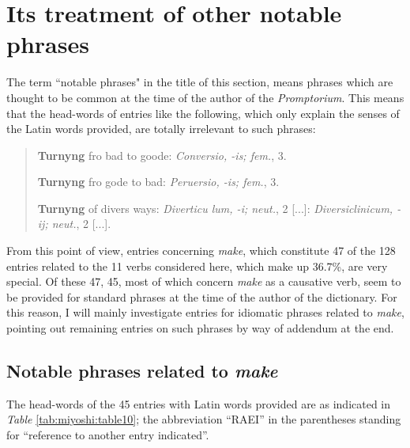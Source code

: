 \documentclass[output=paper,colorlinks,citecolor=brown,arabicfont,chinesefont]{langscibook}
\begin{document}
\section{Its treatment of other notable phrases}

The term “notable phrases" in the title of this section, means phrases which are thought to be common at the time of the author of the \emph{Promptorium}. This means that the head-words of entries like the following, which only explain the senses of the Latin words provided, are totally irrelevant to such phrases:

\begin{quote}
    \textbf{Turnyng} fro bad to goode: \emph{Conversio, -is; fem.}, 3.
    
    \textbf{Turnyng} fro gode to bad: \emph{Peruersio, -is; fem.}, 3.

    \textbf{Turnyng} of divers ways: \emph{Diverticu lum, -i; neut.}, 2 [...]: \emph{Diversiclinicum, -ij; neut.}, 2 [...].
\end{quote}

From this point of view, entries concerning \emph{make}, which constitute 47 of the 128 entries related to the 11 verbs considered here, which make up 36.7\%, are very special. Of these 47, 45, most of which concern \emph{make} as a causative verb, seem to be provided for standard phrases at the time of the author of the dictionary. For this reason, I will mainly investigate entries for idiomatic phrases related to \emph{make}, pointing out remaining entries on such phrases by way of addendum at the end.

\subsection{Notable phrases related to \emph{make}}

The head-words of the 45 entries with Latin words provided are as indicated in \emph{Table} \ref{tab:miyoshi:table10}; the abbreviation “RAEI” in the parentheses standing for “reference to another entry indicated”.
\end{document}
